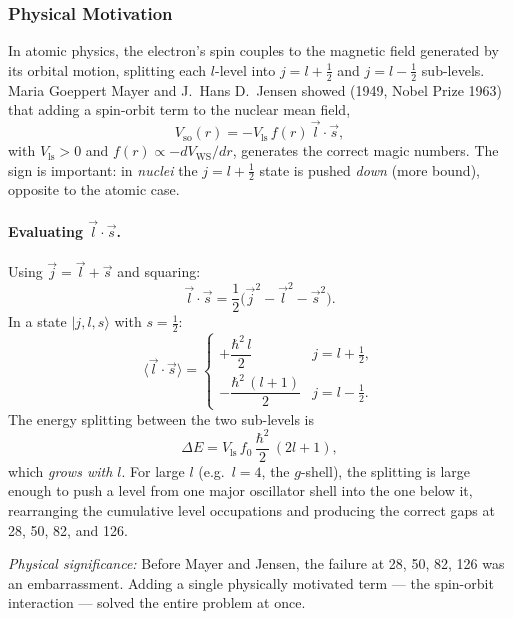 \subsubsection*{Physical Motivation}
In atomic physics, the electron's spin couples to the magnetic field generated
by its orbital motion, splitting each $l$-level into $j=l+\frac{1}{2}$ and
$j=l-\frac{1}{2}$ sub-levels.  Maria Goeppert Mayer and J.\ Hans D.\ Jensen
showed (1949, Nobel Prize 1963) that adding a spin-orbit term to the nuclear
mean field,
\begin{equation}
  \label{eq:lec04:Vso}
  V_\mathrm{so}(r) = -V_\mathrm{ls}\,f(r)\,\vec{l}\cdot\vec{s},
\end{equation}
with $V_\mathrm{ls}>0$ and $f(r)\propto-dV_\mathrm{WS}/dr$, generates the
correct magic numbers.  The sign is important: in \emph{nuclei} the $j=l+\frac{1}{2}$
state is pushed \emph{down} (more bound), opposite to the atomic case.

\paragraph{Evaluating $\vec{l}\cdot\vec{s}$.}
Using $\vec{j}=\vec{l}+\vec{s}$ and squaring:
\begin{equation}
  \label{eq:lec04:LS_identity}
  \vec{l}\cdot\vec{s}=\frac{1}{2}\bigl(\vec{j}^2-\vec{l}^2-\vec{s}^2\bigr).
\end{equation}
In a state $|j,l,s\rangle$ with $s=\frac{1}{2}$:
\begin{equation}
  \label{eq:lec04:LS_expectation}
  \boxed{
  \langle\vec{l}\cdot\vec{s}\rangle =
  \begin{cases}
    +\dfrac{\hbar^2\,l}{2} & j=l+\tfrac{1}{2},\\[6pt]
    -\dfrac{\hbar^2\,(l+1)}{2} & j=l-\tfrac{1}{2}.
  \end{cases}
  }
\end{equation}
The energy splitting between the two sub-levels is
\begin{equation}
  \label{eq:lec04:LS_splitting}
  \Delta E = V_\mathrm{ls}\,f_0\,\frac{\hbar^2}{2}\,(2l+1),
\end{equation}
which \emph{grows with $l$}.  For large $l$ (e.g.\ $l=4$, the $g$-shell), the
splitting is large enough to push a level from one major oscillator shell into
the one below it, rearranging the cumulative level occupations and producing the
correct gaps at 28, 50, 82, and 126.

\textit{Physical significance:} Before Mayer and Jensen, the failure at 28, 50,
82, 126 was an embarrassment.  Adding a single physically motivated term — the
spin-orbit interaction — solved the entire problem at once.

